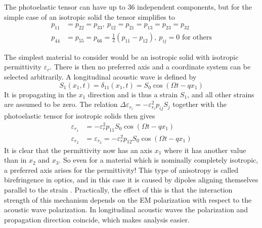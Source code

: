 \documentclass[10pt,a4paper]{eitExjobb}
\begin{document}
	The photoelastic tensor can have up to 36 independent components, but for the simple case of an isotropic solid the tensor simplifies to \cite{Korpel1988}
	\begin{align*}
	p_{11} &= p_{22} = p_{33}, \ p_{12} = p_{21} = p_{13} = p_{23} = p_{32}\\
	p_{44} &= p_{55} = p_{66} = \frac{1}{2} (p_{11} - p_{12}), \ p_{ij} = 0 \text{ for others}
	\end{align*}
	
	The simplest material to consider would be an isotropic solid with isotropic permittivity $\varepsilon_r$. There is then no preferred axis and a coordinate system can be selected arbitrarily. A longitudinal acoustic wave is defined by \begin{equation*}
	S_1(x_1,t) = \delta_{11}(x_1,t) = S_0 \cos(\Omega t - qx_1)
	\end{equation*}
	It is propagating in the $x_1$ direction and is thus a strain $S_1$, and all other strains are assumed to be zero. The relation $\Delta \varepsilon_{r_i} = -\varepsilon_{r_i}^2 p_{ij} S_j$ together with the photoelastic tensor for isotropic solids then gives
	\begin{align*}
	\varepsilon_{r_1} &= -\varepsilon_r^2 p_{11} S_0 \cos(\Omega t - qx_1) \\
	\varepsilon_{r_2} &= \varepsilon_{r_3} = -\varepsilon_r^2 p_{12} S_0 \cos(\Omega t - qx_1)
	\end{align*}
	It is clear that the permittivity now has an axis $x_1$ where it has another value than in $x_2$ and $x_3$. So even for a material which is nominally completely isotropic, a preferred axis arises for the permittivity! This type of anisotropy is called birefringence in optics, and in this case it is caused by dipoles aligning themselves parallel to the strain \cite{Korpel1988}. Practically, the effect of this is that the interaction strength of this mechanism depends on the EM polarization with respect to the acoustic wave polarization. In longitudinal acoustic waves the polarization and propagation direction coincide, which makes analysis easier.
	
\end{document}
